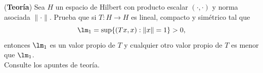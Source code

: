\documentclass[12pt]{article}
\begin{document}
    \begin{ejercicio}
        (\textbf{Teoría}) Sea $H$ un espacio de Hilbert con producto escalar $(\cdot ,\cdot )$ y norma asociada $\|\cdot \|$. Prueba que si $T:H\to H$ es lineal, compacto y simétrico tal que
        \begin{equation*}
            \lm_1 = \sup\{(Tx,x):\|x\| = 1\} > 0,
        \end{equation*}
        entonces $\lm_1$ es un valor propio de $T$ y cualquier otro valor propio de $T$ es menor que $\lm_1$.\\

        \noindent
        Consulte los apuntes de teoría.
    \end{ejercicio}
\end{document}
